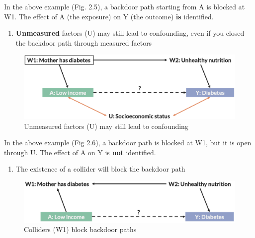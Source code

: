 \documentclass[
]{book}
\providecommand{\tightlist}{%
  \setlength{\itemsep}{0pt}\setlength{\parskip}{0pt}}
\begin{document}
In the above example (Fig. 2.5), a backdoor path starting from A is blocked at W1. The effect of A (the exposure) on Y (the outcome) \textbf{is} identified.

\begin{enumerate}
\def\labelenumi{\arabic{enumi}.}
\setcounter{enumi}{2}
\tightlist
\item
  \textbf{Unmeasured} factors (U) may still lead to confounding, even if you closed the backdoor path through measured factors
\end{enumerate}

\begin{figure}

{\centering \includegraphics[width=1\linewidth]{img/confounding/dag_rules_3} 

}

\caption{Unmeasured factors (U) may still lead to confounding}\label{fig:unnamed-chunk-15}
\end{figure}

In the above example (Fig 2.6), a backdoor path is blocked at W1, but it is open through U. The effect of A on Y is \textbf{not} identified.

\begin{enumerate}
\def\labelenumi{\arabic{enumi}.}
\setcounter{enumi}{3}
\tightlist
\item
  The existence of a collider will block the backdoor path
\end{enumerate}

\begin{figure}

{\centering \includegraphics[width=1\linewidth]{img/confounding/dag_rules_4} 

}

\caption{Colliders (W1) block backdoor paths}\label{fig:unnamed-chunk-16}
\end{figure}
\end{document}
